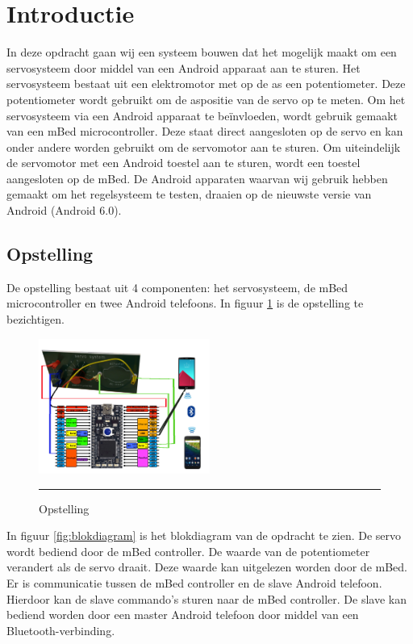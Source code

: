\documentclass[a4paper,12pt]{article}
\begin{document}
\section{Introductie}
In deze opdracht gaan wij een systeem bouwen dat het mogelijk maakt om een servosysteem door middel van een Android apparaat aan te sturen. Het servosysteem bestaat uit een elektromotor met op de as een potentiometer. Deze potentiometer wordt gebruikt om de aspositie van de servo op te meten. Om het servosysteem via een Android apparaat te be\"{i}nvloeden, wordt gebruik gemaakt van een mBed microcontroller. Deze staat direct aangesloten op de servo en kan onder andere worden gebruikt om de servomotor aan te sturen. Om uiteindelijk de servomotor met een Android toestel aan te sturen, wordt een toestel aangesloten op de mBed. De Android apparaten waarvan wij gebruik hebben gemaakt om het regelsysteem te testen, draaien op de nieuwste versie van Android (Android 6.0).  

\subsection{Opstelling}
De opstelling bestaat uit 4 componenten: het servosysteem, de mBed microcontroller en twee Android telefoons. In figuur \ref{fig:opstelling} is de opstelling te bezichtigen.
\vspace{1em}
\begin{figure}[!htbp]
\centering
\includegraphics[width=0.5\textwidth, scale=0.5]{opstelling.png}
\vspace{1ex}
\hrule
\caption{Opstelling}
\label{fig:opstelling}
\end{figure}

In figuur \ref{fig:blokdiagram} is het blokdiagram van de opdracht te zien. De servo wordt bediend door de mBed controller. De waarde van de potentiometer verandert als de servo draait. Deze waarde kan uitgelezen worden door de mBed. Er is communicatie tussen de mBed controller en de slave Android telefoon. Hierdoor kan de slave commando's sturen naar de mBed controller. De slave kan bediend worden door een master Android telefoon door middel van een Bluetooth-verbinding.
\end{document}
